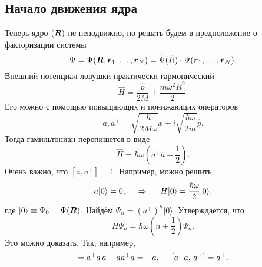 \subsection{Начало движения ядра}

Теперь ядро $(\mbox{\boldmath $R$})$ не неподвижно, но решать будем в предположение о факторизации системы
\begin{equation*}
    \Psi = \Psi(\mbox{\boldmath $R$}, \mbox{\boldmath $r$}_1, \ldots, \mbox{\boldmath $r$}_N) = \tilde{\Psi} (\tilde{R}) \cdot \Psi(\mbox{\boldmath $r$}_1, \ldots, \mbox{\boldmath $r$}_N).
\end{equation*}
Внешний потенциал ловушки практически гармонический
\begin{equation*}
    \hat{H} = \frac{\hat{p}}{2M} + \frac{m \omega^2 R^2}{2}.
\end{equation*}
Его можно с помощью повыщающих и понижающих операторов
\begin{equation*}
    a, a^+ = \sqrt{
    \frac{\hbar}{2 M \omega}
    } x \pm i \sqrt{\frac{\hbar \omega}{2m}} \hat{p}.
\end{equation*}
Тогда гамильтониан перепишется в виде
\begin{equation*}
    \hat{H} = \hbar \omega \left(
        a^+ a + \frac{1}{2}
    \right).
\end{equation*}
Очень важно, что $[a, a^+ ] = 1$. Например, можно решить
\begin{equation*}
    a |0\rangle = 0,
    \hspace{0.5cm} \Rightarrow \hspace{0.5cm}
    H |0\rangle = \frac{\hbar \omega}{2} |0\rangle,
\end{equation*}
где $|0\rangle \equiv \Psi_0 = \Psi(\mbox{\boldmath $R$})$. Найдём $\Psi_n = (a^+)^n |0\rangle.$
Утверждается, что
\begin{equation*}
    H \Psi_n = \hbar \omega  \left(n + \frac{1}{2}\right) \Psi_n.
\end{equation*}
Это можно доказать. Так, например,
\begin{equation*}
    [a^+ a, a] = a^+ a \, a - a a^+ a = - a,
    \hspace{5 mm} 
    [a^+ a, \, a^+] = a^+.
\end{equation*}
